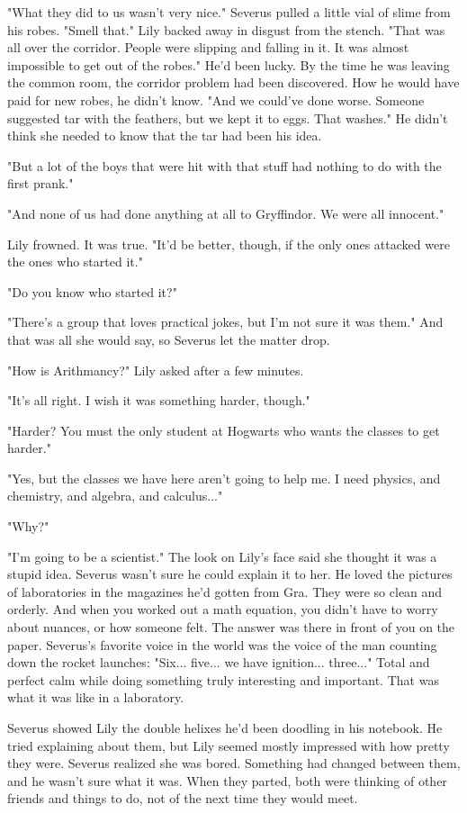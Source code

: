 "What they did to us wasn't very nice." Severus pulled a little vial of slime from his robes. "Smell that." Lily backed away in disgust from the stench. "That was all over the corridor. People were slipping and falling in it. It was almost impossible to get out of the robes." He'd been lucky. By the time he was leaving the common room, the corridor problem had been discovered. How he would have paid for new robes, he didn't know. "And we could've done worse. Someone suggested tar with the feathers, but we kept it to eggs. That washes." He didn't think she needed to know that the tar had been his idea.

"But a lot of the boys that were hit with that stuff had nothing to do with the first prank."

"And none of us had done anything at all to Gryffindor. We were all innocent."

Lily frowned. It was true. "It'd be better, though, if the only ones attacked were the ones who started it."

"Do you know who started it?"

"There's a group that loves practical jokes, but I'm not sure it was them." And that was all she would say, so Severus let the matter drop.

"How is Arithmancy?" Lily asked after a few minutes.

"It's all right. I wish it was something harder, though."

"Harder? You must the only student at Hogwarts who wants the classes to get harder."

"Yes, but the classes we have here aren't going to help me. I need physics, and chemistry, and algebra, and calculus..."

"Why?"

"I'm going to be a scientist." The look on Lily's face said she thought it was a stupid idea. Severus wasn't sure he could explain it to her. He loved the pictures of laboratories in the magazines he'd gotten from Gra. They were so clean and orderly. And when you worked out a math equation, you didn't have to worry about nuances, or how someone felt. The answer was there in front of you on the paper. Severus's favorite voice in the world was the voice of the man counting down the rocket launches: "Six... five... we have ignition... three..." Total and perfect calm while doing something truly interesting and important. That was what it was like in a laboratory.

Severus showed Lily the double helixes he'd been doodling in his notebook. He tried explaining about them, but Lily seemed mostly impressed with how pretty they were. Severus realized she was bored. Something had changed between them, and he wasn't sure what it was. When they parted, both were thinking of other friends and things to do, not of the next time they would meet.

